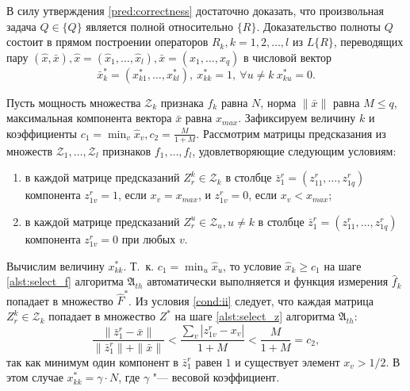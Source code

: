 \begin{Proof}
	В силу утверждения \ref{pred:correctness} достаточно доказать, что произвольная задача $Q\in\{Q\}$ является полной относительно $\{R\}$. Доказательство полноты $Q$ состоит в прямом построении операторов $R_k, k=1,2,\dots,l$ из $L\{R\}$, переводящих пару $(\hat{x},\bar{x}), \hat{x}=(\hat{x}_1,\dots,\hat{x}_l), \bar{x}=(x_1,\dots,x_q)$ в числовой вектор
	\begin{equation} \label{crit:fillness}
		\bar{x}_k^*=(x_{k1}^*,\dots,x_{kl}^*),\ x_{kk}^*=1,\ \forall u\neq k\ x_{ku}^*=0.
	\end{equation} 
	
	Пусть мощность множества $\mathcal Z_k$ признака $f_k$ равна $N$, норма $\|\bar x\|$ равна $M{\leqslant}q$, максимальная компонента вектора $\bar{x}$ равна $x_{max}$. Зафиксируем величину $k$ и коэффициенты $c_1=\min_v\hat x_v, c_2=\frac{M}{1+M}$. Рассмотрим матрицы предсказания из множеств $\mathcal{Z}_1,\dots,\mathcal{Z}_l$ признаков $f_1,\dots,f_l$, удовлетворяющие следующим условиям:
	
 \begin{enumerate}
	 	\item в каждой матрице предсказаний $Z_r^k\in\mathcal Z_k$ в столбце $\bar{z}_1^r=(z_{11}^r,\dots,z_{1q}^r)$ компонента $z_{1v}^r=1$, если $x_v=x_{max}$, и $z_{1v}^r=0$, если $x_v<x_{max}$; \label{cond:ii}
	 	
	 	\item в каждой матрице предсказаний $Z_r^u\in\mathcal Z_u, u\neq k$ в столбце $\bar{z}_1^r=(z_{11}^r,\dots,z_{1q}^r)$ компонента $z_{1v}^r=0$ при любых $v$. \label{cond:ij}
 \end{enumerate}
 
 Вычислим величину $x_{kk}^*$. Т.~к. $c_1=\min_u\hat x_u$, то условие $\hat x_k\geqslant c_1$ на шаге \ref{alst:select_f} алгоритма $\mathfrak A_{th}$ автоматически выполняется и функция измерения $\hat f_k$ попадает в множество $\hat F^*$. Из условия \ref{cond:ii} следует, что каждая матрица $Z_r^k\in\mathcal Z_k$ попадает в множество $Z^*$ на шаге \ref{alst:select_z} алгоритма $\mathfrak A_{th}$:
 \begin{equation}
 	\frac{\|\bar{z}_1^r-\bar{x}\|}{\|\bar{z}_1^r\|+\|\bar{x}\|}<\frac{\sum_v|z_{1v}^r-x_v|}{1+M}<\frac{M}{1+M}=c_2,
 \end{equation}
 так как минимум один компонент в $\bar{z}_1^r$ равен $1$ и существует элемент $x_v>1/2$. В этом случае $x_{kk}^*=\gamma{\cdot}N$, где $\gamma$ "--- весовой коэффициент.
 

\end{Proof}

